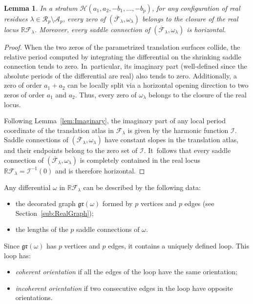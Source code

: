 \documentclass[JEP,XML,SOM,Unicode,NoFloatCountersInSection,published]{cedram}
\newtheorem{lem}[thm]{Lemma}
\theoremstyle{definition}
\begin{document}
\begin{lem}\label{lem:RealLocus}
In a stratum $\mathcal{H}(a_{1},a_{2},-b_{1},\dots,-b_{p})$, for any configuration of real residues $\lambda\in \mathcal{R}_p\setminus\mathcal{A}_{p}$, every zero of $(\overline{\mathcal{F}}_{\lambda},\omega_{\lambda})$ belongs to the closure of the real locus $\mathbb{R}\mathcal{F}_{\lambda}$. Moreover, every saddle connection of $(\overline{\mathcal{F}}_{\lambda},\omega_{\lambda})$ is horizontal.
\end{lem}

\begin{proof}
When the two zeros of the parametrized translation surfaces collide, the relative period computed by integrating the differential on the shrinking saddle connection tends to zero. In~particular, its imaginary part (well-defined since the absolute periods of the differential are real) also tends to zero. Additionally, a zero of order $a_1+a_2$ can be locally split via a horizontal opening direction to two zeros of order $a_1$ and $a_2$. Thus, every zero of $\omega_{\lambda}$ belongs to the closure of the real locus.

Following Lemma~\ref{lem:Imaginary}, the imaginary part of any local period coordinate of the translation atlas in $\mathcal{F}_{\lambda}$ is given by the harmonic function $\mathcal{I}$. Saddle connections of $(\overline{\mathcal{F}}_{\lambda},\omega_{\lambda})$ have constant slopes in the translation atlas, and their endpoints belong to the zero set of $\mathcal{I}$. It~follows that every saddle connection of $(\overline{\mathcal{F}}_{\lambda},\omega_{\lambda})$ is completely contained in the real locus $\mathbb{R}\mathcal{F}_{\lambda} = \mathcal{I}^{-1}(0)$ and is therefore horizontal.
\end{proof}

Any differential $\omega$ in $\mathbb{R}\mathcal{F}_{\lambda}$ can be described by the following data:
\begin{itemize}
\item the decorated graph $\mathfrak{gr}(\omega)$ formed by $p$ vertices and $p$ edges (see Section~\ref{sub:RealGraph});
\item the lengths of the $p$ saddle connections of $\omega$.
\end{itemize}

Since $\mathfrak{gr}(\omega)$ has $p$ vertices and $p$ edges, it contains a uniquely defined loop. This loop has:
\begin{itemize}
\item \textit{coherent orientation} if all the edges of the loop have the same orientation;
\item \textit{incoherent orientation} if two consecutive edges in the loop have opposite orientations.
\end{itemize}
\end{document}
